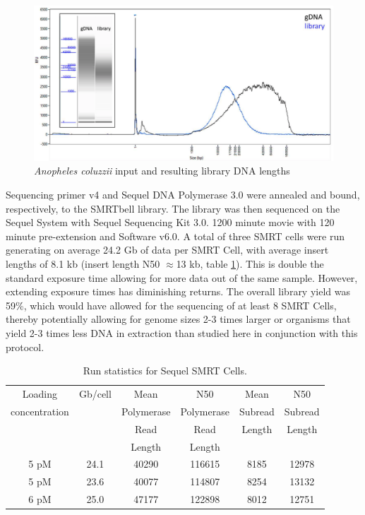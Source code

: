 \begin{figure}[htbp!]
\caption{\textit{Anopheles coluzzii} input and resulting library DNA lengths}
\label{figure:fempto}
\begin{centering}
\includegraphics[width=.85\textwidth]{fempto.png}
\end{centering}

\end{figure}

\par{
Sequencing primer v4 and Sequel DNA Polymerase 3.0 were annealed and bound, respectively, to the SMRTbell library. The library was then sequenced on the Sequel System with Sequel Sequencing Kit 3.0. 1200 minute movie with 120 minute pre-extension and Software v6.0. A total of three SMRT cells were run generating on average 24.2 Gb of data per SMRT Cell, with average insert lengths of 8.1 kb (insert length N50 $\approx$13 kb, table \ref{table:dataamount}). This is double the standard exposure time allowing for more data out of the same sample. However, extending exposure times has diminishing returns. The overall library yield was 59\%, which would have allowed for the sequencing of at least 8 SMRT Cells, thereby potentially allowing for genome sizes 2-3 times larger or organisms that yield 2-3 times less DNA in extraction than studied here in conjunction with this protocol.
}

\begin{table}[htbp!]
\caption{Run statistics for Sequel SMRT Cells.}\label{table:dataamount}
\begin{tabular}{| c | c | c | c | c | c |}
\hline
Loading & Gb/cell & Mean  & N50 &  Mean &  N50  \\
concentration & & Polymerase & Polymerase & Subread & Subread \\
& & Read & Read & Length & Length \\ 
& & Length &Length & & \\\hline
5 pM & 24.1 & 40290 & 116615 & 8185 & 12978 \\\hline
5 pM & 23.6 & 40077 & 114807 & 8254 & 13132 \\\hline
6 pM & 25.0 & 47177 & 122898 & 8012 & 12751 \\\hline
\end{tabular}
\end{table}



